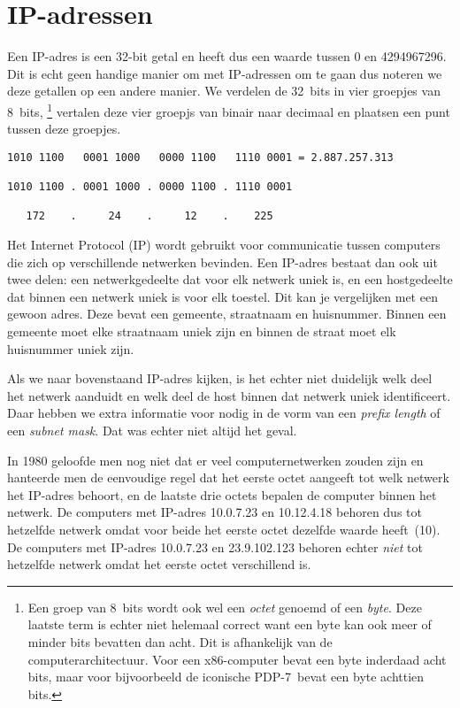 \section{IP-adressen}

Een IP-adres is een 32-bit getal en heeft dus een waarde tussen 0 en \num{4294967296}.
Dit is echt geen handige manier om met IP-adressen om te gaan dus noteren we deze getallen op een andere manier.
We verdelen de 32~bits in vier groepjes van 8~bits,%
   \footnote{%
      Een groep van 8~bits wordt ook wel een \emph{octet} genoemd of een \emph{byte}.
      Deze laatste term is echter niet helemaal correct want een byte kan ook meer of minder bits bevatten dan acht.
      Dit is afhankelijk van de computerarchitectuur.
      Voor een x86-computer bevat een byte inderdaad acht bits, maar voor bijvoorbeeld de iconische PDP-7\footnotemark\ 
      bevat een byte achttien bits.
   }%
vertalen deze vier groepjs van binair naar decimaal en plaatsen een punt tussen deze groepjes.

\begin{verbatim}
1010 1100   0001 1000   0000 1100   1110 0001 = 2.887.257.313

1010 1100 . 0001 1000 . 0000 1100 . 1110 0001

   172    .     24    .     12    .    225
\end{verbatim}

Het Internet Protocol (IP) wordt gebruikt voor communicatie tussen computers die zich op verschillende netwerken bevinden.
Een IP-adres bestaat dan ook uit twee delen: een netwerkgedeelte dat voor elk netwerk uniek is, en een hostgedeelte dat binnen een netwerk uniek is voor elk toestel.
Dit kan je vergelijken met een gewoon adres.
Deze bevat een gemeente, straatnaam en huisnummer.
Binnen een gemeente moet elke straatnaam uniek zijn en binnen de straat moet elk huisnummer uniek zijn.

Als we naar bovenstaand IP-adres kijken, is het echter niet duidelijk welk deel het netwerk aanduidt en welk deel de host binnen dat netwerk uniek identificeert.
Daar hebben we extra informatie voor nodig in de vorm van een \emph{prefix length} of een \emph{subnet mask}.
Dat was echter niet altijd het geval.

In 1980 geloofde men nog niet dat er veel computernetwerken zouden zijn en hanteerde men de eenvoudige regel dat het eerste octet aangeeft tot welk netwerk het IP-adres behoort, en de laatste drie octets bepalen de computer binnen het netwerk.
De computers met IP-adres 10.0.7.23 en 10.12.4.18 behoren dus tot hetzelfde netwerk omdat voor beide het eerste octet dezelfde waarde heeft~(10).
De computers met IP-adres 10.0.7.23 en 23.9.102.123 behoren echter \emph{niet} tot hetzelfde netwerk omdat het eerste octet verschillend is.

